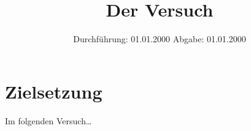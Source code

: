 

\subject{V123} %
\title{Der Versuch} %
\date{
    Durchführung: 01.01.2000 %
     \hspace{3em}
    Abgabe: 01.01.2000 %
}


\maketitle
\thispagestyle{empty}
\tableofcontents
\newpage

\section{Zielsetzung}

    Im folgenden Versuch… %


\clearpage


\clearpage


\clearpage


\clearpage

\printbibliography


